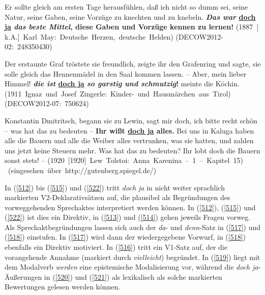 \begin{exe}
	\ex\label{520} 
	\scriptsize
	Er sollte gleich am ersten Tage herausfühlen, daß ich nicht so dumm sei, seine Natur, seine Gaben, seine Vorzüge zu knechten und zu knebeln. 				\textbf{\textit{Das war} \underline{doch ja} \textit{das beste Mittel}, diese Gaben und Vorzüge kennen zu lernen!}			
	\hfill\hbox{(1887 $[$k.A.$]$ Karl May: Deutsche Herzen, deutsche Helden)}
	\newline
	\hbox{}\hfill\hbox{(DECOW2012-02: 248350430)}
\end{exe}									 

\begin{exe}
	\ex\label{521} 
	\scriptsize
	Der erstaunte Graf tröstete sie freundlich, zeigte ihr den Grafenring und sagte, sie solle gleich das Hennenmädel in den Saal kommen lassen. – \glqq 		Aber, mein lieber Himmel! \textbf{\textit{die ist} \underline{doch ja} \textit{so garstig und schmutzig}!}\grqq{} meinte die Köchin.
	\newline
	\hbox{}\hfill\hbox{(1911 Ignaz und Josef Zingerle: Kinder- und Hausmärchen aus Tirol)}
	\newline
	\hbox{}\hfill\hbox{(DECOW2012-07: 750624)}
\end{exe}				             								            
  
\begin{exe}
	\ex\label{522} 
	\scriptsize
	\glqq Konstantin Dmitritsch,\grqq{} begann sie zu Lewin, \glqq sagt mir doch, ich bitte recht schön – was hat das zu 				bedeuten – \textbf{Ihr wißt 			\underline{doch ja} alles.} Bei uns in Kaluga haben alle die Bauern und alle die 			Weiber alles vertrunken, was sie hatten, und zahlen uns jetzt keine Steuern mehr. Was hat das zu bedeuten? Ihr lobt doch die 	Bauern sonst stets!\grqq{} – 
	\hfill\hbox{(1920 [1920] Lew Tolstoi: Anna Karenina – 1 – Kapitel 15)}
	\newline
	\hbox{}\hfill\hbox{ (eingesehen über http://gutenberg.spiegel.de/)}
\end{exe}					 
In (\ref{512}) bis (\ref{515}) und (\ref{522}) tritt \textit{doch ja} in nicht weiter sprachlich markierten V2-Deklarativsätzen auf, die plausibel als Begründungen des vorweggehenden Sprech\-aktes interpretiert werden können. In (\ref{512}), (\ref{515}) und (\ref{522}) ist dies ein Direktiv, in (\ref{513}) und (\ref{514}) gehen jeweils Fragen vorweg. Als Sprechaktbegründungen  lassen sich auch der \textit{da}- und \textit{denn}-Satz in (\ref{517}) und (\ref{518}) einstufen. In (\ref{517}) wird dann der wiedergegebene  Vorwurf, in (\ref{518}) ebenfalls ein Direktiv  motiviert. In (\ref{516}) tritt ein V1-Satz auf, der die vorangehende Annahme (markiert durch \textit{vielleicht}) begründet. In (\ref{519}) liegt mit dem Modalverb \textit{werden} eine epistemische Modalisierung  vor, während die \textit{doch ja}-Äußerungen in (\ref{520}) und (\ref{521}) als lexikalisch als solche markierten Bewertungen gelesen werden können. 

